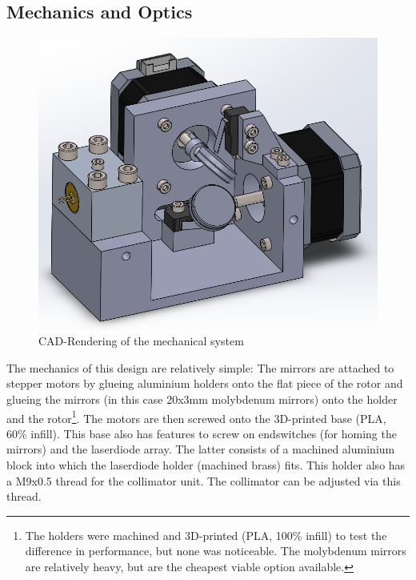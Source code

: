\documentclass[a4paper, 11pt]{scrartcl}
\begin{document}
\subsection{Mechanics and Optics}
\begin{figure}[H]
\begin{center}
\includegraphics[width=15cm]{img/mechanics.png}
\caption{CAD-Rendering of the mechanical system}
\label{mechanics}
\end{center}
\end{figure}
The mechanics of this design are relatively simple: The mirrors are attached to stepper motors by glueing aluminium holders onto the flat piece of the rotor and glueing the mirrors (in this case 20x3mm molybdenum mirrors) onto the holder and the rotor\footnote{The holders were machined and 3D-printed (PLA, 100\% infill) to test the difference in performance, but none was noticeable. The molybdenum mirrors are relatively heavy, but are the cheapest viable option available.}. The motors are then screwed onto the 3D-printed base (PLA, 60\% infill). This base also has features to screw on endswitches (for homing the mirrors) and the laserdiode array. The latter consists of a machined aluminium block into which the laserdiode holder (machined brass) fits. This holder also has a M9x0.5 thread for the collimator unit. The collimator can be adjusted via this thread. \\
\end{document}
